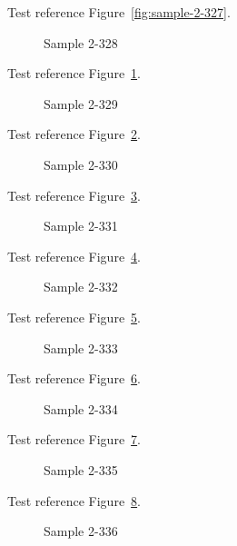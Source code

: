 Test reference Figure~\ref{fig:sample-2-327}.

\begin{figure}[tbhp]
\caption{Sample 2-328}
\label{fig:sample-2-328}
\end{figure}

Test reference Figure~\ref{fig:sample-2-328}.

\begin{figure}[tbhp]
\caption{Sample 2-329}
\label{fig:sample-2-329}
\end{figure}

Test reference Figure~\ref{fig:sample-2-329}.

\begin{figure}[tbhp]
\caption{Sample 2-330}
\label{fig:sample-2-330}
\end{figure}

Test reference Figure~\ref{fig:sample-2-330}.

\begin{figure}[tbhp]
\caption{Sample 2-331}
\label{fig:sample-2-331}
\end{figure}

Test reference Figure~\ref{fig:sample-2-331}.

\begin{figure}[tbhp]
\caption{Sample 2-332}
\label{fig:sample-2-332}
\end{figure}

Test reference Figure~\ref{fig:sample-2-332}.

\begin{figure}[tbhp]
\caption{Sample 2-333}
\label{fig:sample-2-333}
\end{figure}

Test reference Figure~\ref{fig:sample-2-333}.

\begin{figure}[tbhp]
\caption{Sample 2-334}
\label{fig:sample-2-334}
\end{figure}

Test reference Figure~\ref{fig:sample-2-334}.

\begin{figure}[tbhp]
\caption{Sample 2-335}
\label{fig:sample-2-335}
\end{figure}

Test reference Figure~\ref{fig:sample-2-335}.

\begin{figure}[tbhp]
\caption{Sample 2-336}
\label{fig:sample-2-336}
\end{figure}

